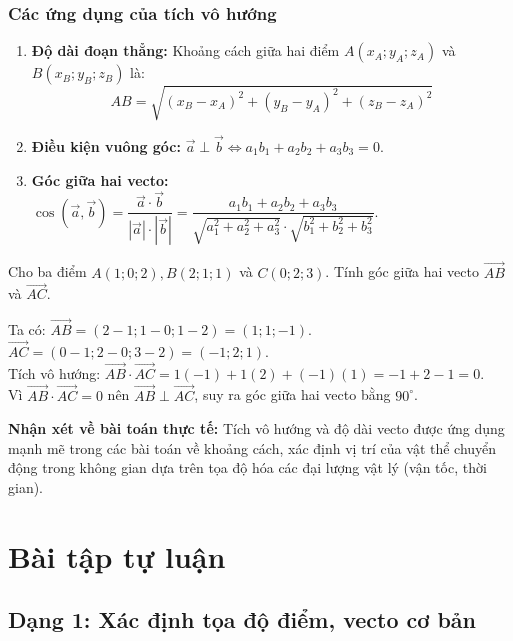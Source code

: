 \documentclass[12pt]{article}
\begin{document}
	\subsubsection{Các ứng dụng của tích vô hướng}
	\begin{enumerate}
		\item \textbf{Độ dài đoạn thẳng:} Khoảng cách giữa hai điểm $A(x_A; y_A; z_A)$ và $B(x_B; y_B; z_B)$ là:
		\[ AB = \sqrt{(x_B - x_A)^2 + (y_B - y_A)^2 + (z_B - z_A)^2} \]
		\item \textbf{Điều kiện vuông góc:} $\vec{a} \perp \vec{b} \iff a_1b_1 + a_2b_2 + a_3b_3 = 0$.
		\item \textbf{Góc giữa hai vecto:} $\cos(\vec{a}, \vec{b}) = \dfrac{\vec{a} \cdot \vec{b}}{|\vec{a}| \cdot |\vec{b}|} = \dfrac{a_1b_1 + a_2b_2 + a_3b_3}{\sqrt{a_1^2 + a_2^2 + a_3^2} \cdot \sqrt{b_1^2 + b_2^2 + b_3^2}}$.
	\end{enumerate}
	
	\begin{vidu}[5]
		Cho ba điểm $A(1; 0; 2), B(2; 1; 1)$ và $C(0; 2; 3)$. Tính góc giữa hai vecto $\vec{AB}$ và $\vec{AC}$.
	\end{vidu}
	
	\begin{loigiai}
		Ta có: $\vec{AB} = (2-1; 1-0; 1-2) = (1; 1; -1)$.
		$\vec{AC} = (0-1; 2-0; 3-2) = (-1; 2; 1)$.
		\\
		Tích vô hướng: $\vec{AB} \cdot \vec{AC} = 1(-1) + 1(2) + (-1)(1) = -1 + 2 - 1 = 0$.
		\\
		Vì $\vec{AB} \cdot \vec{AC} = 0$ nên $\vec{AB} \perp \vec{AC}$, suy ra góc giữa hai vecto bằng $90^\circ$.
	\end{loigiai}
	
	\noindent \textbf{Nhận xét về bài toán thực tế:}
	Tích vô hướng và độ dài vecto được ứng dụng mạnh mẽ trong các bài toán về khoảng cách, xác định vị trí của vật thể chuyển động trong không gian dựa trên tọa độ hóa các đại lượng vật lý (vận tốc, thời gian).
	
	\section{Bài tập tự luận}
	\subsection{Dạng 1: Xác định tọa độ điểm, vecto cơ bản}
	
\end{document}

